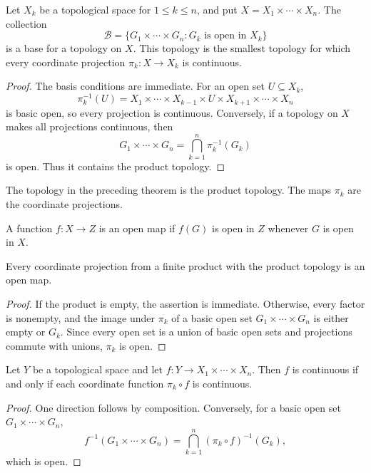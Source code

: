 \begin{thm}
Let $X_k$ be a topological space for $1\leq k\leq n$, and put
$X=X_1\times\cdots\times X_n$. The collection
\[
\mathcal{B}=\{G_1\times\cdots\times G_n:G_k\text{ is open in }X_k\}
\]
is a base for a topology on $X$. This topology is the smallest topology for
which every coordinate projection $\pi_k:X\to X_k$ is continuous.
\end{thm}

\begin{proof}
The basis conditions are immediate. For an open set $U\subseteq X_k$,
\[
\pi_k^{-1}(U)=X_1\times\cdots\times X_{k-1}\times U\times
X_{k+1}\times\cdots\times X_n
\]
is basic open, so every projection is continuous. Conversely, if a topology
on $X$ makes all projections continuous, then
\[
G_1\times\cdots\times G_n=\bigcap_{k=1}^n\pi_k^{-1}(G_k)
\]
is open. Thus it contains the product topology.
\end{proof}

\begin{de}
The topology in the preceding theorem is the product topology. The maps
$\pi_k$ are the coordinate projections.
\end{de}

\begin{de}
A function $f:X\to Z$ is an open map if $f(G)$ is open in $Z$ whenever $G$
is open in $X$.
\end{de}

\begin{thm}
Every coordinate projection from a finite product with the product topology
is an open map.
\end{thm}

\begin{proof}
If the product is empty, the assertion is immediate. Otherwise, every factor
is nonempty, and the image under $\pi_k$ of a basic open set
$G_1\times\cdots\times G_n$ is either empty or $G_k$. Since every open set
is a union of basic open sets and projections commute with unions,
$\pi_k$ is open.
\end{proof}

\begin{thm}
Let $Y$ be a topological space and let
$f:Y\to X_1\times\cdots\times X_n$. Then $f$ is continuous if and only if
each coordinate function $\pi_k\circ f$ is continuous.
\end{thm}

\begin{proof}
One direction follows by composition. Conversely, for a basic open set
$G_1\times\cdots\times G_n$,
\[
f^{-1}(G_1\times\cdots\times G_n)
=\bigcap_{k=1}^n(\pi_k\circ f)^{-1}(G_k),
\]
which is open.
\end{proof}

